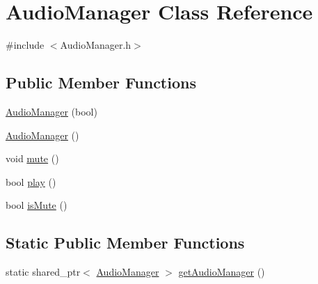 \hypertarget{class_audio_manager}{\section{Audio\+Manager Class Reference}
\label{class_audio_manager}
}


{\ttfamily \#include $<$Audio\+Manager.\+h$>$}

\subsection*{Public Member Functions}
\begin{DoxyCompactItemize}
\item 
\hyperlink{class_audio_manager_ab9185d5d1fac7694ef1b86615c06b30e}{Audio\+Manager} (bool)
\item 
\hyperlink{class_audio_manager_ae59d8605c1d706e7bab47d4e8f900d09}{Audio\+Manager} ()
\item 
void \hyperlink{class_audio_manager_a413714ef87ed432842fb9c3571a1d3f2}{mute} ()
\item 
bool \hyperlink{class_audio_manager_abc84cf825cff23791751a2aadce32b43}{play} ()
\item 
bool \hyperlink{class_audio_manager_a24d2077e232ef579229e7c70205e37a4}{is\+Mute} ()
\end{DoxyCompactItemize}
\subsection*{Static Public Member Functions}
\begin{DoxyCompactItemize}
\item 
static shared\+\_\+ptr$<$ \hyperlink{class_audio_manager}{Audio\+Manager} $>$ \hyperlink{class_audio_manager_a9bd57da07855563c46daaa9d1aec5d29}{get\+Audio\+Manager} ()
\end{DoxyCompactItemize}


